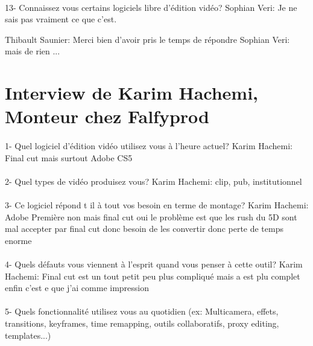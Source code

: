 \paragraph{}
13- Connaissez vous certains logiciels libre d'édition vidéo?
Sophian Veri: Je ne sais pas vraiment ce que c'est.

Thibault Saunier: Merci bien d'avoir pris le temps de répondre
    Sophian Veri: mais de rien
    ...

\section*{Interview de Karim Hachemi, Monteur chez Falfyprod}

\paragraph{}
1-  Quel logiciel d'édition vidéo utilisez vous à l'heure actuel?
Karim Hachemi: Final cut mais surtout Adobe CS5

\paragraph{}
2- Quel types de vidéo produisez vous?
Karim Hachemi: clip, pub, institutionnel

\paragraph{}
3- Ce logiciel répond t il à tout vos besoin en terme de montage?
Karim Hachemi: Adobe Première non mais final cut oui le problème est que les
rush du 5D sont mal accepter par final cut donc besoin de les
convertir donc perte de temps enorme

\paragraph{}
4- Quels défauts vous viennent à l'esprit quand vous penser à cette outil?
Karim Hachemi: Final cut est un tout petit peu plus compliqué mais a
est plu complet enfin c'est e que j'ai comme impression


\paragraph{}
5-  Quels fonctionnalité utilisez vous au quotidien (ex: Multicamera, effets,
transitions, keyframes, time remapping, outils collaboratifs, proxy
editing, templates...)

